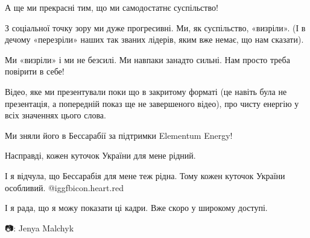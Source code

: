 А ще ми прекрасні тим, що ми самодостатнє суспільство!

З соціальної точку зору ми дуже прогресивні. Ми, як суспільство, «визріли». (І
в дечому «перезріли» наших так званих лідерів, яким вже немає, що нам сказати).

Ми «визріли» і ми не безсилі. Ми навпаки занадто сильні. Нам просто треба
повірити в себе!

Відео, яке ми презентували поки що в закритому форматі (це навіть була не
презентація, а попередній показ ще не завершеного відео), про чисту енергію у
всіх значеннях цього слова. 

Ми зняли його в Бессарабії за підтримки Elementum Energy!

Насправді, кожен куточок України для мене рідний. 

І я відчула, що Бессарабія для мене  теж рідна. Тому кожен куточок України
особливий. @igg{fbicon.heart.red}

І я рада, що я можу показати ці кадри. Вже скоро у широкому доступі.

📷: Jenya Malchyk
